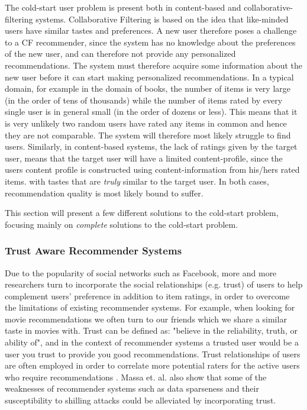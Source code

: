 The cold-start user problem is present both in content-based and
collaborative-filtering systems. Collaborative Filtering is based on the idea that like-minded users have similar tastes and
preferences. A new user therefore poses a challenge to a CF recommender, since
the system has no knowledge about the preferences of the new user, and can
therefore not provide any personalized recommendations. The system must therefore acquire some
information about the new user before it can start making personalized recommendations. In a typical domain, for example in the domain of books, the number of items is very large (in the order of tens of thousands) while the number of items rated by every single user is in general small (in the order of dozens or less). This means that it is very unlikely two random users have rated any items in common and hence they are not comparable. The system will therefore most likely struggle to find users. Similarly, in content-based systems, the lack of ratings
given by the target user, means that the target user will have a limited
content-profile, since the users content profile is constructed using content-information from his/hers rated items. 
with tastes that are \emph{truly} similar to the target user. In both cases, recommendation quality is most likely bound to suffer.
		
This section will present a few different solutions to the cold-start problem, focusing mainly on \emph{complete} solutions to the cold-start problem. 




\subsubsection{Trust Aware Recommender Systems}

Due to the popularity of social networks such as Facebook, more and more
researchers turn to incorporate the social relationships (e.g. trust) of users
to help complement users’ preference in addition to item ratings, in order to overcome the limitations of existing recommender systems. For example, when looking for movie recommendations we often turn to our friends which we share a similar taste in movies with. Trust can be defined as: "believe in the reliability, truth, or ability of", and in the context of recommender systems a trusted user would be a user you trust to provide you good recommendations. Trust relationships of users are often employed in order to correlate more potential raters for the active users who require recommendations \cite{Massa2004, Massa2007}. Massa et. al. \citep{Massa2004} also show that some of the weaknesses of recommender systems such as data sparseness and their susceptibility to shilling attacks could be alleviated by incorporating trust. 

